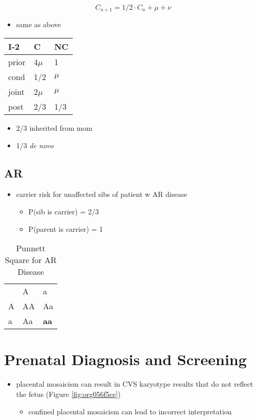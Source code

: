 \documentclass[12pt]{scrartcl}
\begin{document}
\[C_{n+1} = 1/2 \cdot C_n + \mu + \nu \]

\begin{itemize}
\item same as above
\end{itemize}

\begin{center}
\begin{tabular}{lll}
I-2 & C & NC\\
\hline
prior & 4\(\mu\) & 1\\
cond \footnotemark & 1/2 & \(\mu\)\\
joint & 2\(\mu\) & \(\mu\)\\
post & 2/3 & 1/3\\
\end{tabular}
\end{center}


\begin{itemize}
\item 2/3 inherited from mom
\item 1/3 \emph{de novo}
\end{itemize}

\subsection{AR}
\label{sec:orgae523b7}
\begin{itemize}
\item carrier risk for unaffected sibs of patient w AR disease
\begin{itemize}
\item P(sib is carrier) = 2/3
\item P(parent is carrier) = 1
\end{itemize}
\end{itemize}

\begin{table}[htbp]
\caption{\label{tab:org91420a6}Punnett Square for AR Disease}
\centering
\begin{tabular}{lll}
 & A & a\\
A & AA & Aa\\
a & Aa & \textbf{aa}\\
\end{tabular}
\end{table}

\section{Prenatal Diagnosis and Screening}
\label{sec:orgdf71f54}
\begin{itemize}
\item placental mosaicism can result in CVS karyotype results that do not
reflect the fetus (Figure \ref{fig:org056f5ce})
\begin{itemize}
\item confined placental mosaicism can lead to incorrect interpretation
\end{itemize}
\end{itemize}
\end{document}
